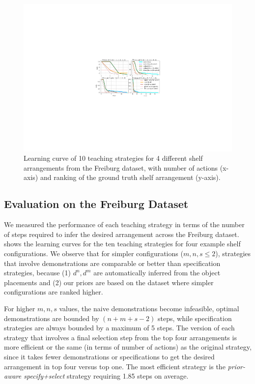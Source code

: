 \begin{figure}[h]
	\includegraphics[width=\linewidth]{figures/rankVsSteps-new}
	\caption{Learning curve of 10 teaching strategies for 4 different shelf arrangements from the Freiburg dataset, with number of actions (x-axis) and ranking of the ground truth shelf arrangement (y-axis).}
	\label{fig:rankVSsteps}
\end{figure}

\subsection{Evaluation on the Freiburg Dataset}
We measured the performance of each teaching strategy in terms of the number of steps required to infer the desired arrangement across the Freiburg dataset.
 shows the learning curves for the ten teaching strategies for four example shelf configurations.
We observe that for simpler configurations ($m,n,s \leq 2$), strategies that involve demonstrations are comparable or better than specification strategies, because (1) $d^n, d^m$ are automatically inferred from the object placements and (2) our priors are based on the dataset where simpler configurations are ranked higher.

For higher $m,n,s$ values, the naive demonstrations become infeasible, optimal demonstrations are bounded by $(n+m+s-2)$ steps, while specification strategies are always bounded by a maximum of 5 steps. 
The version of each strategy that involves a final selection step from the top four arrangements is more efficient or the same (in terms of number of actions) as the original strategy, since it takes fewer demonstrations or specifications to get the desired arrangement in top four versus top one. 
The most efficient strategy is the \textit{prior-aware specify+select} strategy requiring 1.85 steps on average. 

